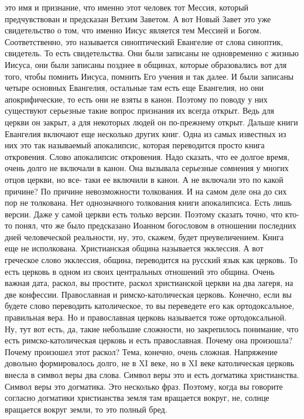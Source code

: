 это имя и признание, что именно этот человек тот Мессия, который предчувствован
и предсказан Ветхим Заветом. А вот Новый Завет это уже свидетельство о том, что
именно Иисус является тем Мессией и Богом. Соответственно, это называется
синоптический Евангелие от слова синоптик, свидетель. То есть свидетельства. Они
были записаны не одновременно с жизнью Иисуса, они были записаны позднее в
общинах, которые образовались вот для того, чтобы помнить Иисуса, помнить Его
учения и так далее. И были записаны четыре основных Евангелия, остальные там
есть еще Евангелия, но они апокрифические, то есть они не взяты в канон. Поэтому
по поводу у них существуют серьезные такие вопрос признания их всегда открыт.
Ведь для церкви он закрыт, а для некоторых людей он по-прежнему открыт. Дальше
книги Евангелия включают еще несколько других книг. Одна из самых известных из
них это так называемый апокалипсис, которая переводится просто книга откровения.
Слово апокалипсис откровения. Надо сказать, что ее долгое время, очень долго не
включали в канон. Она вызывала серьезные сомнения у многих отцов церкви, но все-
таки ее включили в канон. А не включали это по какой причине? По причине
невозможности толкования. И на самом деле она до сих пор не толкована. Нет
однозначного толкования книги апокалипсиса. Есть лишь версии. Даже у самой
церкви есть только версии. Поэтому сказать точно, что кто-то понял, что же было
предсказано Иоанном богословом в отношении последних дней человеческой
реальности, ну, это, скажем, будет преувеличением. Книга еще не исполкована.
Христианская община называется экклессия. А вот греческое слово экклессия,
община, переводится на русский язык как церковь. То есть церковь в одном из
своих центральных отношений это община. Очень важная дата, раскол, вы простите,
раскол христианской церкви на два лагеря, на две конфессии. Православная и
римско-католическая церковь. Конечно, если вы будете слово переводить
католическое, то вы переведете его как ортодоксальное, правильная вера. Но и
православная церковь называется тоже ортодоксальной. Ну, тут вот есть, да, такие
небольшие сложности, но закрепилось понимание, что есть римско-католическая
церковь и есть православная. Почему она произошла? Почему произошел этот раскол?
Тема, конечно, очень сложная. Напряжение довольно формировалось долго, не в XI
веке, но в XI веке католическая церковь внесла в символ веры два слова. Символ
веры это и есть догматика христианства. Символ веры это догматика. Это несколько
фраз. Поэтому, когда вы говорите согласно догматики христианства земля там
вращается вокруг, не, солнце вращается вокруг земли, то это полный бред.
